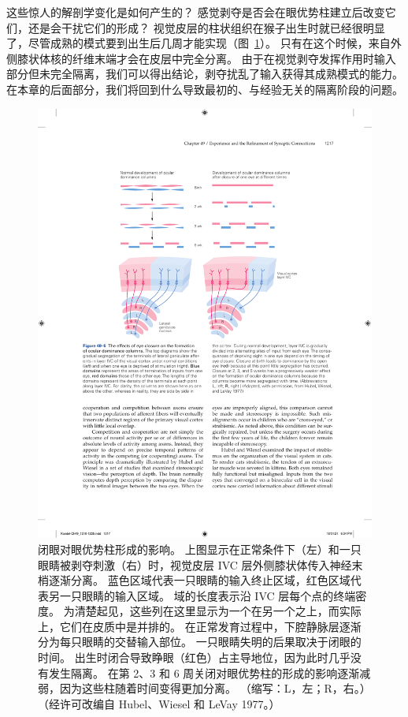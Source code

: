 这些惊人的解剖学变化是如何产生的？
感觉剥夺是否会在眼优势柱建立后改变它们，还是会干扰它们的形成？
视觉皮层的柱状组织在猴子出生时就已经很明显了，尽管成熟的模式要到出生后几周才能实现（图~\ref{fig:49_5}）。
只有在这个时候，来自外侧膝状体核的纤维末端才会在皮层中完全分离。
由于在视觉剥夺发挥作用时输入部分但未完全隔离，我们可以得出结论，剥夺扰乱了输入获得其成熟模式的能力。
在本章的后面部分，我们将回到什么导致最初的、与经验无关的隔离阶段的问题。


\begin{figure}[htbp]
	\centering
	\includegraphics[width=0.8\linewidth]{chap49/fig_49_5}
	\caption{闭眼对眼优势柱形成的影响。 上图显示在正常条件下（左）和一只眼睛被剥夺刺激（右）时，视觉皮层 IVC 层外侧膝状体传入神经末梢逐渐分离。 蓝色区域代表一只眼睛的输入终止区域，红色区域代表另一只眼睛的输入区域。 域的长度表示沿 IVC 层每个点的终端密度。 为清楚起见，这些列在这里显示为一个在另一个之上，而实际上，它们在皮质中是并排的。 在正常发育过程中，下腔静脉层逐渐分为每只眼睛的交替输入部位。 一只眼睛失明的后果取决于闭眼的时间。 出生时闭合导致睁眼（红色）占主导地位，因为此时几乎没有发生隔离。 在第 2、3 和 6 周关闭对眼优势柱的形成的影响逐渐减弱，因为这些柱随着时间变得更加分离。 （缩写：L，左；R，右。）（经许可改编自 Hubel、Wiesel 和 LeVay 1977。）}
	\label{fig:49_5}
\end{figure}


